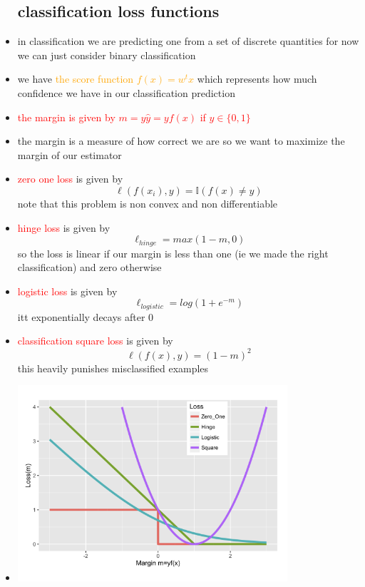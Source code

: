 \documentclass{article}
\begin{document}
\begin{itemize}
\subsection*{classification loss functions}
\item in classification we are predicting one from a set of discrete quantities for now we can just consider binary classification
\item we have \textcolor{orange}{the score function $f(x)=w^tx$ } which represents how much confidence we have in our classification prediction
\item \textcolor{red}{the margin is given by $m=y\hat{y}=yf(x)$ if $y\in \{0,1\}$}
\item the margin is a measure of how correct we are so we want to maximize the margin of our estimator
\item \textcolor{red}{zero one loss} is given by $$\ell(f(x_i), y)=\mathbb{I}(f(x)\neq y)$$ note that this problem is non convex and non differentiable
\item \textcolor{red}{hinge loss} is given by $$\ell_{hinge}=max(1-m,0)$$ so the loss is linear if our margin is less than one (ie we made the right classification) and zero otherwise 
\item \textcolor{red}{logistic loss } is given by $$\ell_{logistic}=log(1+e^{-m})$$ itt exponentially decays after 0
\item \textcolor{red}{classification square loss} is given by $$\ell(f(x),y)=(1-m)^2$$ this heavily punishes misclassified examples
\item \includegraphics*[width=10cm]{images/Screenshot 2023-05-10 at 8.56.09 PM.png}
\end{itemize}
\end{document}
